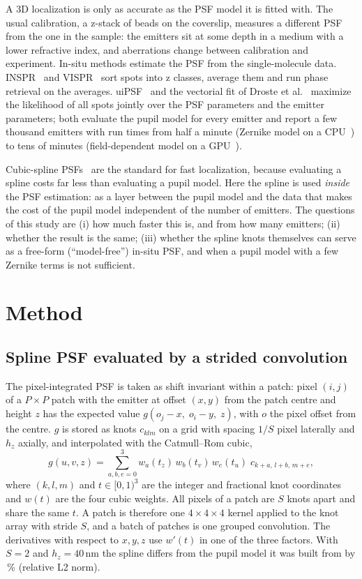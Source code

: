 \documentclass[11pt,a4paper]{article}
\begin{document}
A 3D localization is only as accurate as the PSF model it is fitted with. The usual calibration, a z-stack of
beads on the coverslip, measures a different PSF from the one in the sample: the emitters sit at some depth in a
medium with a lower refractive index, and aberrations change between calibration and experiment. In-situ methods
estimate the PSF from the single-molecule data. INSPR~\cite{inspr} and VISPR~\cite{vispr} sort spots into z
classes, average them and run phase retrieval on the averages. uiPSF~\cite{uipsf} and the vectorial fit of
Droste et al.~\cite{droste} maximize the likelihood of all spots jointly over the PSF parameters and the emitter
parameters; both evaluate the pupil model for every emitter and report a few thousand emitters with run times
from half a minute (Zernike model on a CPU~\cite{droste}) to tens of minutes (field-dependent model on a
GPU~\cite{uipsf}).

Cubic-spline PSFs~\cite{cspline} are the standard for fast localization, because evaluating a spline costs far
less than evaluating a pupil model. Here the spline is used \emph{inside} the PSF estimation: as a layer between
the pupil model and the data that makes the cost of the pupil model independent of the number of emitters. The
questions of this study are (i) how much faster this is, and from how many emitters; (ii) whether the result is
the same; (iii) whether the spline knots themselves can serve as a free-form (``model-free'') in-situ PSF, and
when a pupil model with a few Zernike terms is not sufficient.

\section{Method}

\subsection{Spline PSF evaluated by a strided convolution}

The pixel-integrated PSF is taken as shift invariant within a patch: pixel $(i,j)$ of a $P\times P$ patch with
the emitter at offset $(x,y)$ from the patch centre and height $z$ has the expected value
$g(o_j-x,\;o_i-y,\;z)$, with $o$ the pixel offset from the centre. $g$ is stored as knots $c_{klm}$ on a grid
with spacing $1/S$ pixel laterally and $h_z$ axially, and interpolated with the Catmull--Rom cubic,
\begin{equation}
g(u,v,z)=\sum_{a,b,e=0}^{3} w_a(t_z)\,w_b(t_v)\,w_e(t_u)\;c_{k+a,\,l+b,\,m+e},
\end{equation}
where $(k,l,m)$ and $t\in[0,1)^3$ are the integer and fractional knot coordinates and $w(t)$ are the four cubic
weights. All pixels of a patch are $S$ knots apart and share the same $t$. A patch is therefore one
$4\times4\times4$ kernel applied to the knot array with stride $S$, and a batch of patches is one grouped
convolution. The derivatives with respect to $x,y,z$ use $w'(t)$ in one of the three factors. With $S=2$ and
$h_z=40$\,nm the spline differs from the pupil model it was built from by \splineerr\,\% (relative L2 norm).
\end{document}
